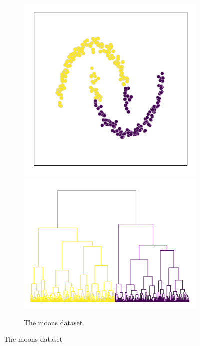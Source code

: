 \begin{figure}
    \centering
    \begin{subfigure}{\textwidth}
        \centering
        \includegraphics[height=\hierheight]{hierarchical/moons}
        \includegraphics[height=\hierheight]{dendogram/moons}
        \caption{The moons dataset}\label{fig:hierarchical_moons}
    \end{subfigure}


\end{figure}
